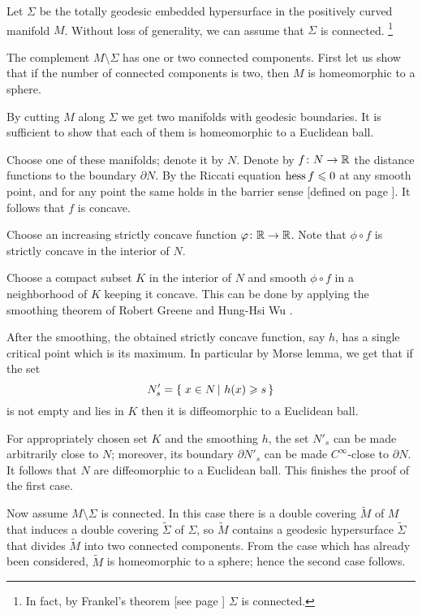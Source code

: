 Let $\Sigma$ be the totally geodesic embedded hypersurface in the positively curved manifold $M$.
Without loss of generality, we can assume that $\Sigma$ is connected.%
\footnote{In fact, by Frankel's theorem [see page \pageref{page:frankel}] $\Sigma$ is connected.}

The complement $M\setminus\Sigma$ has one or two connected components.
First let us show that if the number of connected components is two, 
then $M$ is homeomorphic to a sphere.

By cutting $M$ along $\Sigma$ 
we get two manifolds
with geodesic boundaries.
It is sufficient to show that each of them is homeomorphic to a Euclidean ball.

Choose one of these manifolds; denote it by $N$.
Denote by $f\:N\z\to\RR$ the distance functions to the boundary $\partial N$.
By the Riccati equation $\operatorname{\rm hess}\nolimits f\leqslant 0$ at any smooth point,
and for any point the same holds in the barrier sense [defined on page \pageref{page:barrier sense}].
It follows that $f$ is concave.

Choose an increasing strictly concave function $\varphi\colon\mathbb{R}\to\mathbb{R}$.
Note that $\phi\circ f$ is strictly concave in the interior of $N$.

Choose a compact subset $K$ in the interior of $N$ and
smooth $\phi\circ f$ in a neighborhood of $K$ keeping it concave. 
This can be done by applying the smoothing theorem of Robert Greene and Hung-Hsi Wu \cite[Theorem~2]{greene-wu}.

After the smoothing, the obtained strictly concave function, say $h$, has a single critical point which is its maximum.
In particular by Morse lemma, we get that if the set  
\[N'_s=\set{x\in N}{h(x)\ge s}\]
is not empty and lies in $K$ then it is diffeomorphic to a Euclidean ball.

For appropriately chosen set $K$ and the smoothing $h$, the set $N'_s$ can be made arbitrarily close to $N$;
moreover, its boundary $\partial N'_s$ can be made $C^\infty$-close to $\partial N$.
It follows that $N$ are diffeomorphic to a Euclidean ball.
This finishes the proof of the first case.

Now assume $M\setminus\Sigma$ is connected.
In this case there is a double covering $\tilde M$ of $M$ that induces a double covering $\tilde\Sigma$ of $\Sigma$,
so $\tilde M$ contains a geodesic hypersurface $\tilde\Sigma$ that divides $\tilde M$ into two connected components. 
From the case which has already been considered, $\tilde M$ is homeomorphic to a sphere;
hence the second case follows.
\qeds

